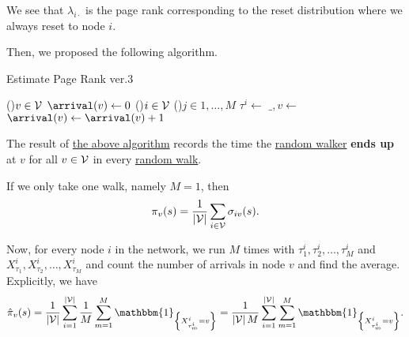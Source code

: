 \begin{remark}
	We see that \(\lambda _{i\cdot}\) is the page rank corresponding to the reset distribution where we always reset to node \(i\).
\end{remark}

Then, we proposed the following algorithm.
\par
\begin{algorithm}[H]\label{algo:Monte-Carlo-algorithm-3}
	\DontPrintSemicolon
	\caption{Estimate Page Rank ver.3}

	\BlankLine

	\For(){\(v\in \mathcal{\MakeUppercase{v}} \)}{
		\(\arrival(v)\gets 0\)\;
	}
	\;
	\For(){\(i\in \mathcal{\MakeUppercase{v}}\)}{
		\For(){\(j\in 1, \ldots, M\)}{
			\(\tau^i \gets \) 
			\(\_, v \gets\)
			\(\arrival(v)\gets \arrival(v) + 1\)
		}
	}
	\Return{\arrival}\;
\end{algorithm}
\begin{note}
	The result of \hyperref[algo:Monte-Carlo-algorithm-3]{the above algorithm} records the time the \hyperref[def:random-walker]{random walker}
	\textbf{ends up} at \(v\) for all \(v\in \mathcal{\MakeUppercase{v}} \) in every \hyperref[algo:random-walk-algorithm]{random walk}.
\end{note}

If we only take one walk, namely \(M = 1\), then
\[
	\pi_v(s) = \frac{1}{\left\vert \mathcal{\MakeUppercase{v}}  \right\vert }\sum\limits_{i\in\mathcal{V}}\sigma_{iv}(s).
\]

Now, for every node \(i\) in the network, we run \(M\) times with \(\tau^i_1, \tau^i_2, \ldots , \tau^i_M\) and
\(X_{\tau_1}^i, X_{\tau_2}^i, \ldots , X_{\tau_M}^i\) and count the number of arrivals in node \(v\) and find the average.
Explicitly, we have
\[
	\hat{\pi}_v(s)
	= \frac{1}{\left\vert \mathcal{\MakeUppercase{v}} \right\vert}\sum\limits_{i=1}^{\left\vert \mathcal{\MakeUppercase{v}}\right\vert} \frac{1}{M}\sum\limits_{m=1}^{M} \mathbbm{1}_{\left\{X^i_{\tau^i_m} = v\right\}}
	= \frac{1}{\left\vert \mathcal{\MakeUppercase{v}}  \right\vert M}\sum\limits_{i=1}^{\left\vert \mathcal{\MakeUppercase{v}} \right\vert} \sum\limits_{m=1}^{M} \mathbbm{1}_{\left\{X^i_{\tau^i_m} = v\right\}}.
\]

